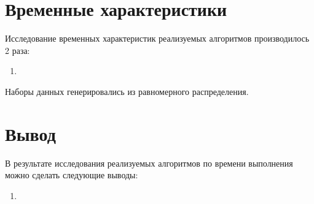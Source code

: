\section{Временные характеристики}

Исследование временных характеристик реализуемых алгоритмов производилось 2 раза:
\begin{enumerate}
	\item 
\end{enumerate}
Наборы данных генерировались из равномерного распределения.

\section{Вывод}

В результате исследования реализуемых алгоритмов по времени выполнения можно сделать следующие выводы:
\begin{enumerate}
	\item 
\end{enumerate}
